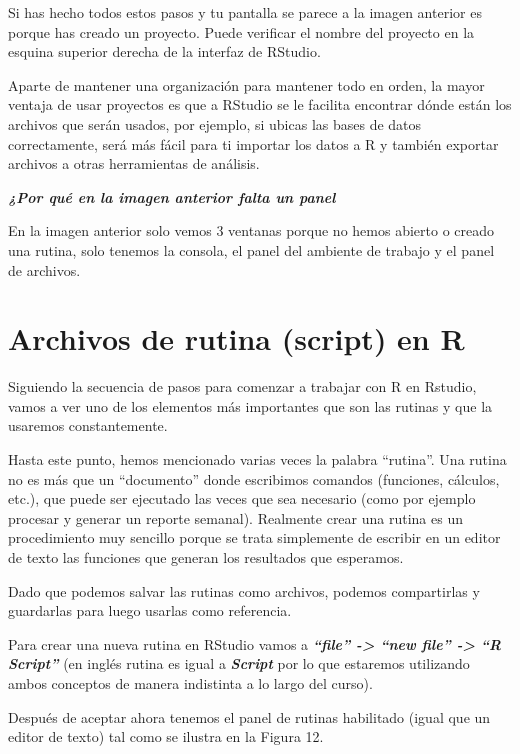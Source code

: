 \documentclass[
  letterpaper,
  DIV=11,
  numbers=noendperiod]{scrreprt}
\begin{document}
Si has hecho todos estos pasos y tu pantalla se parece a la imagen
anterior es porque has creado un proyecto. Puede verificar el nombre del
proyecto en la esquina superior derecha de la interfaz de RStudio.

Aparte de mantener una organización para mantener todo en orden, la
mayor ventaja de usar proyectos es que a RStudio se le facilita
encontrar dónde están los archivos que serán usados, por ejemplo, si
ubicas las bases de datos correctamente, será más fácil para ti importar
los datos a R y también exportar archivos a otras herramientas de
análisis.

\textbf{\emph{¿Por qué en la imagen anterior falta un panel}}

En la imagen anterior solo vemos 3 ventanas porque no hemos abierto o
creado una rutina, solo tenemos la consola, el panel del ambiente de
trabajo y el panel de archivos.

\section{Archivos de rutina (script) en
R}\label{archivos-de-rutina-script-en-r}

Siguiendo la secuencia de pasos para comenzar a trabajar con R en
Rstudio, vamos a ver uno de los elementos más importantes que son las
rutinas y que la usaremos constantemente.

Hasta este punto, hemos mencionado varias veces la palabra ``rutina''.
Una rutina no es más que un ``documento'' donde escribimos comandos
(funciones, cálculos, etc.), que puede ser ejecutado las veces que sea
necesario (como por ejemplo procesar y generar un reporte semanal).
Realmente crear una rutina es un procedimiento muy sencillo porque se
trata simplemente de escribir en un editor de texto las funciones que
generan los resultados que esperamos.

Dado que podemos salvar las rutinas como archivos, podemos compartirlas
y guardarlas para luego usarlas como referencia.

Para crear una nueva rutina en RStudio vamos a \textbf{\emph{``file''
-\textgreater{} ``new file'' -\textgreater{} ``R Script''}} (en inglés
rutina es igual a \textbf{\emph{Script}} por lo que estaremos utilizando
ambos conceptos de manera indistinta a lo largo del curso).

Después de aceptar ahora tenemos el panel de rutinas habilitado (igual
que un editor de texto) tal como se ilustra en la Figura 12.
\end{document}
